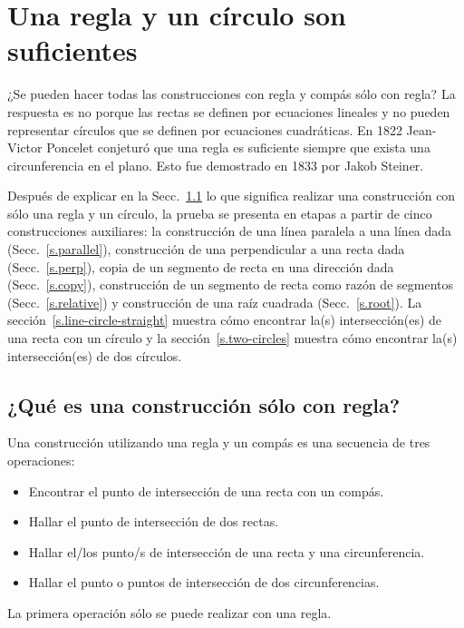 
\chapter{Una regla y un círculo son suficientes}\label{c.straightedge}


¿Se pueden hacer todas las construcciones con regla y compás sólo con regla? La respuesta es no porque las rectas se definen por ecuaciones lineales y no pueden representar círculos que se definen por ecuaciones cuadráticas. En 1822 Jean-Victor Poncelet conjeturó que una regla es suficiente siempre que exista una circunferencia en el plano. Esto fue demostrado en 1833 por Jakob Steiner.

Después de explicar en la Secc.~\ref{s.se-what} lo que significa realizar una construcción con sólo una regla y un círculo, la prueba se presenta en etapas a partir de cinco construcciones auxiliares: la construcción de una línea paralela a una línea dada (Secc.~\ref{s.parallel}), construcción de una perpendicular a una recta dada (Secc.~\ref{s.perp}), copia de un segmento de recta en una dirección dada (Secc.~\ref{s.copy}), construcción de un segmento de recta como razón de segmentos (Secc.~\ref{s.relative}) y construcción de una raíz cuadrada (Secc.~\ref{s.root}). La sección~\ref{s.line-circle-straight} muestra cómo encontrar la(s) intersección(es) de una recta con un círculo y la sección~\ref{s.two-circles} muestra cómo encontrar la(s) intersección(es) de dos círculos.

\section{¿Qué es una construcción sólo con regla?}\label{s.se-what}

Una construcción utilizando una regla y un compás es una secuencia de tres operaciones:
\begin{itemize}
\item Encontrar el punto de intersección de una recta con un compás.
\item Hallar el punto de intersección de dos rectas.
\item Hallar el/los punto/s de intersección de una recta y una circunferencia.
\item Hallar el punto o puntos de intersección de dos circunferencias.
\end{itemize}
La primera operación sólo se puede realizar con una regla.

